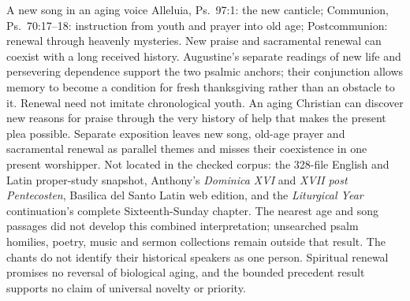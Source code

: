 \begin{proposal}{A new song in an aging voice}
 Alleluia, Ps.~97:1: the new canticle; Communion, Ps.~70:17--18: instruction from youth and prayer into old age; Postcommunion: renewal through heavenly mysteries.
 New praise and sacramental renewal can coexist with a long received history. Augustine's separate readings of new life and persevering dependence support the two psalmic anchors; their conjunction allows memory to become a condition for fresh thanksgiving rather than an obstacle to it. 
 Renewal need not imitate chronological youth. An aging Christian can discover new reasons for praise through the very history of help that makes the present plea possible.
 Separate exposition leaves new song, old-age prayer and sacramental renewal as parallel themes and misses their coexistence in one present worshipper.
 Not located in the checked corpus: the 328-file English and Latin proper-study snapshot, Anthony's \textit{Dominica XVI} and \textit{XVII post Pentecosten}, Basilica del Santo Latin web edition, and the \textit{Liturgical Year} continuation's complete Sixteenth-Sunday chapter. The nearest age and song passages did not develop this combined interpretation; unsearched psalm homilies, poetry, music and sermon collections remain outside that result.
 The chants do not identify their historical speakers as one person. Spiritual renewal promises no reversal of biological aging, and the bounded precedent result supports no claim of universal novelty or priority.
\end{proposal}

